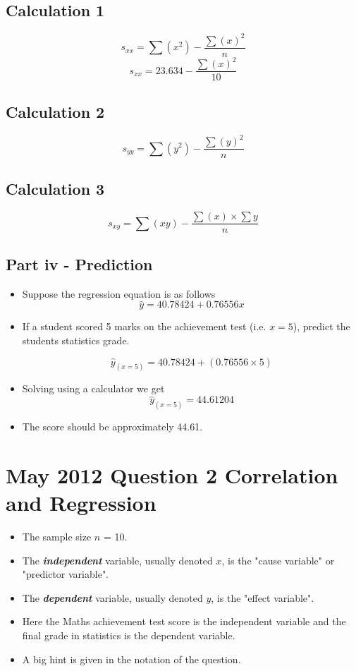 \documentclass[]{report}
\begin{document}
\subsection*{Calculation 1}
\[ s_{xx}  = \sum(x^2) - \frac{\sum(x)^2}{n} \]
\[ s_{xx}  = 23.634 - \frac{\sum(x)^2}{10} \]

\subsection*{Calculation 2}
\[ s_{yy}  = \sum(y^2) - \frac{\sum(y)^2}{n} \]


\subsection*{Calculation 3}
\[ s_{xy}  = \sum(xy) - \frac{\sum(x)\times \sum{y}}{n} \]


\subsection*{Part iv - Prediction}
\begin{itemize}
	\item Suppose the regression equation is as follows
	\[ \hat{y} = 40.78424 + 0.76556 x \]
	\item If a student scored 5 marks on the achievement test (i.e. $x=5$), predict the students statistics grade.
	
	\[ \hat{y}_{(x=5)} = 40.78424 + (0.76556 \times 5) \]
	
	\item Solving using a calculator we get
	\[ \hat{y}_{(x=5)} = 44.61204 \]
	
	\item The score should be approximately 44.61.
\end{itemize}


\section{May 2012 Question 2 Correlation and Regression}
\begin{itemize}
	\item The sample size $n$ = 10.
	\item The \textbf{\textit{independent}} variable, usually denoted $x$, is the "cause variable" or "predictor variable".
	\item The \textbf{\textit{dependent}} variable, usually denoted $y$, is the "effect variable".
	\item Here the Maths achievement test score is the independent variable and the final grade in statistics is the dependent variable.
	\item A big hint is given in the notation of the question.
\end{itemize}
\end{document}
